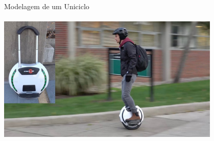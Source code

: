 \documentclass{beamer}
\begin{document}
\begin{frame}[c]{Modelagem de um Uniciclo}
    \framesubtitle{}
    \centering
    \includegraphics[width=0.8\textwidth]{images/unicycle.jpg}
\end{frame}
\end{document}
